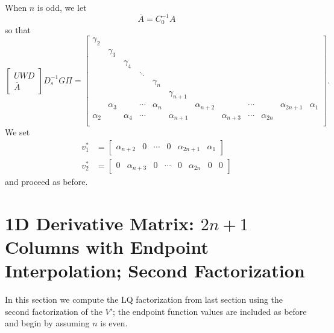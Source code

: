 When $n$ is odd, we let
%
\begin{equation}
    \overline{A} = C_{0}^{-1}A
\end{equation}
%
so that
%
\begin{equation}
    \label{eq:CV_D_1D_2n_E_F2_L_odd}
    \begin{bmatrix} UWD \\ \overline{A} \end{bmatrix}D_{s}^{-1}G\Pi
        = \begin{bmatrix}
            \gamma_{2} & \\
            & \gamma_{3} & \\
            & & \gamma_{4} & \\
            &   &   & \ddots \\
            & & & & \gamma_{n} & \\
            & & & & & \gamma_{n+1} & \\
            & \alpha_{3} & & \cdots & \alpha_{n} &
                & \alpha_{n+2} & & \cdots & & \alpha_{2n+1} & \alpha_{1} \\
            \alpha_{2} & & \alpha_{4} & \cdots & & \alpha_{n+1} & &
                \alpha_{n+3} & \cdots & \alpha_{2n} & & \\
            \end{bmatrix}.
\end{equation}
%
We set
%
\begin{align}
    v_{1}^{*} &= \begin{bmatrix} \alpha_{n+2} & 0 & \cdots &
                0 & \alpha_{2n+1} & \alpha_{1} \end{bmatrix} \nonumber\\
    v_{2}^{*} &= \begin{bmatrix} 0 & \alpha_{n+3} & 0 & \cdots & 0 &
                \alpha_{2n} & 0 & 0 \end{bmatrix}
\end{align}
%
and proceed as before.



\section{1D \CV{} Derivative Matrix: $2n+1$ Columns with Endpoint Interpolation;
    Second Factorization}
\label{sec:CV_D_1D_2n_E_F1}

In this section we compute the LQ factorization from last section using
the second factorization of the $V'$;
the endpoint function values are included as before
and begin by assuming $n$ is even.

